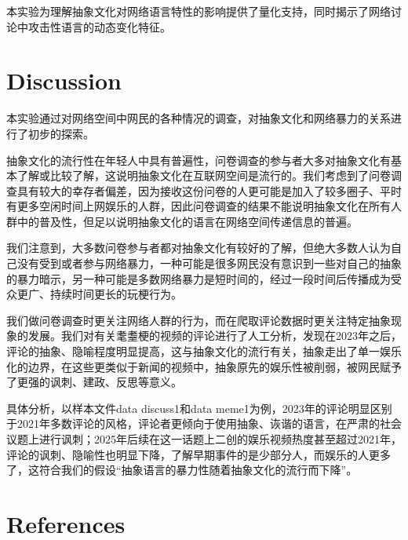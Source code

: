 \documentclass[12pt,a4paper]{ctexart}
\begin{document}
本实验为理解抽象文化对网络语言特性的影响提供了量化支持，同时揭示了网络讨论中攻击性语言的动态变化特征。
\section{Discussion}
本实验通过对网络空间中网民的各种情况的调查，对抽象文化和网络暴力的关系进行了初步的探索。

抽象文化的流行性在年轻人中具有普遍性，问卷调查的参与者大多对抽象文化有基本了解或比较了解，这说明抽象文化在互联网空间是流行的。我们考虑到了问卷调查具有较大的幸存者偏差，因为接收这份问卷的人更可能是加入了较多圈子、平时有更多空闲时间上网娱乐的人群，因此问卷调查的结果不能说明抽象文化在所有人群中的普及性，但足以说明抽象文化的语言在网络空间传递信息的普遍。

我们注意到，大多数问卷参与者都对抽象文化有较好的了解，但绝大多数人认为自己没有受到或者参与网络暴力，一种可能是很多网民没有意识到一些对自己的抽象的暴力暗示，另一种可能是多数网络暴力是短时间的，经过一段时间后传播成为受众更广、持续时间更长的玩梗行为。

我们做问卷调查时更关注网络人群的行为，而在爬取评论数据时更关注特定抽象现象的发展。我们对有关耄耋梗的视频的评论进行了人工分析，发现在2023年之后，评论的抽象、隐喻程度明显提高，这与抽象文化的流行有关，抽象走出了单一娱乐化的边界，在这些更类似于新闻的视频中，抽象原先的娱乐性被削弱，被网民赋予了更强的讽刺、建政、反思等意义。

具体分析，以样本文件data discuss1和data meme1为例，2023年的评论明显区别于2021年多数评论的风格，评论者更倾向于使用抽象、诙谐的语言，在严肃的社会议题上进行讽刺；2025年后续在这一话题上二创的娱乐视频热度甚至超过2021年，评论的讽刺、隐喻性也明显下降，了解早期事件的是少部分人，而娱乐的人更多了，这符合我们的假设“抽象语言的暴力性随着抽象文化的流行而下降”。


\section{References}
\end{document}
